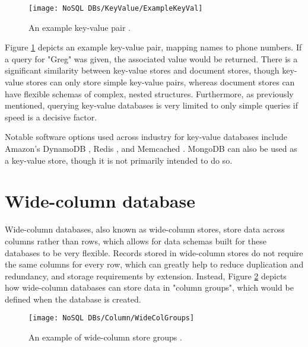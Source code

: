 
\begin{figure}[H]
    \centering
    \texttt{[image: NoSQL DBs/KeyValue/ExampleKeyVal]}
    \caption{An example key-value pair \autocite{redisWhatKeyValueDatabase}.\label{fig:ExampleKeyVal}}
\end{figure}


\noindent Figure \ref{fig:ExampleKeyVal} depicts an example key-value pair, mapping names to phone numbers. If a query for "Greg" was given, 
the associated value would be returned. There is a significant similarity between key-value stores and document stores, though key-value stores
can only store simple key-value pairs, whereas document stores can have flexible schemas of complex, nested structures. Furthermore, as previously 
mentioned, querying key-value databases is very limited to only simple queries if speed is a decisive factor. 

\para Notable software options used across industry for key-value databases include Amazon's DynamoDB \autocite{awsFastNoSQLKeyValue}, Redis \autocite{redisWhatKeyValueDatabase}, and Memcached \autocite{memcachedMemcachedDistributedMemory}. MongoDB can also be used as a key-value store,
though it is not primarily intended to do so.


\section{Wide-column database}

Wide-column databases, also known as wide-column stores, store data across columns rather than rows, which allows for data schemas built for these 
databases to be very flexible. Records stored in wide-column stores do not require the same columns for every row, which can greatly help to reduce 
duplication and redundancy, and storage requirements by extension. Instead, Figure \ref{fig:ExampleWideCol} depicts how wide-column databases can store 
data in "column groups", which would be defined when the database is created.

\begin{figure}[H]
    \centering
    \texttt{[image: NoSQL DBs/Column/WideColGroups]}
    \caption{An example of wide-column store groups \autocite{poreNoSQLDataArchitecture2018}.\label{fig:ExampleWideCol}}
\end{figure}

